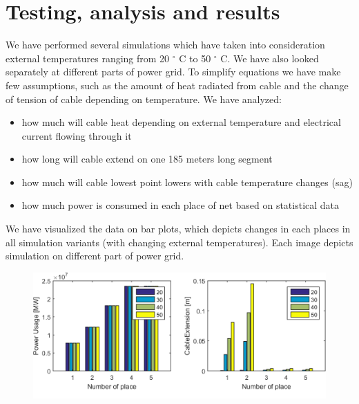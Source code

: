 \documentclass[a4paper]{article}
\begin{document}
%                                      
\section{Testing, analysis and results}   
\label{cha:testingAnalysisAndResults}

We have performed several simulations which have taken into consideration external temperatures ranging from 20 $^{\circ}$  C to 50 $^{\circ}$  C. We have also looked separately at different parts of power grid. To simplify equations we have make few assumptions, such as the amount of heat radiated from cable and the change of tension of cable depending on temperature. We have analyzed:\\

\begin{itemize}
\item how much will cable heat depending on external temperature and electrical current flowing through it
\item how long will cable extend on one 185 meters long segment
\item how much will cable lowest point lowers with cable temperature changes (sag)
\item how much power is consumed in each place of net based on statistical data\\
\end{itemize}

We have visualized the data on bar plots, which depicts changes in each places in all simulation variants (with changing external temperatures). Each image depicts simulation on different part of power grid.\\

\begin{figure}[!h]
\centering
\includegraphics[scale=0.44]{schemas/img5_1.png}
\label{fig:img5_1}
\end{figure}
\end{document}
